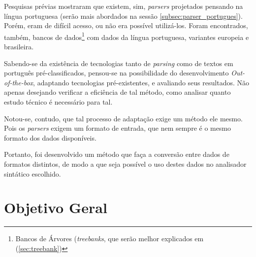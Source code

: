 Pesquisas prévias mostraram que existem, sim, \textit{parsers} projetados pensando na língua portuguesa (serão mais abordados na sessão \ref{subsec:parser_portugues}). Porém, eram de difícil acesso, ou não era possível utilizá-los. Foram encontrados, também, bancos de dados\footnote{Bancos de Árvores (\textit{treebanks}, que serão melhor explicados em (\ref{sec:treebank})} com dados da língua portuguesa, variantes europeia e brasileira.

Sabendo-se da existência de tecnologias tanto de \textit{parsing} como de textos em português pré-classificados, pensou-se na possibilidade do desenvolvimento \textit{Out-of-the-box}, adaptando tecnologias pré-existentes, e avaliando seus resultados. Não apenas desejando verificar a eficiência de tal método, como analisar quanto estudo técnico é necessário para tal.

Notou-se, contudo, que tal processo de adaptação exige um método ele mesmo. Pois os \textit{parsers} exigem um formato de entrada, que nem sempre é o mesmo formato dos dados disponíveis.

Portanto, foi desenvolvido um método que faça a conversão entre dados de formatos distintos, de modo a que seja possível o uso destes dados no analisador sintático escolhido.




\section{Objetivo Geral}
\label{sec:objetivos-gerais}

